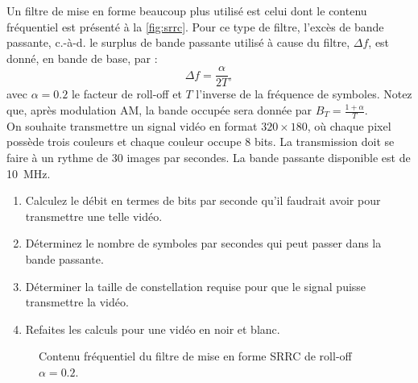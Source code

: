 \documentclass [a4paper, 11pt] {article}
\begin{document}
    \begin{exercice}{4}
        
        Un filtre de mise en forme beaucoup plus utilisé est celui dont le contenu fréquentiel est présenté à la \autoref{fig:srrc}. Pour ce type de filtre, l'excès de bande passante, c.-à-d. le surplus de bande passante utilisé à cause du filtre, $\Delta f$, est donné, en bande de base, par :
        \begin{equation}
            \Delta f = \frac{\alpha}{2 T},
        \end{equation}
        avec $\alpha=0.2$ le facteur de roll-off et $T$ l'inverse de la fréquence de symboles. Notez que, après modulation AM, la bande occupée sera donnée par $B_T=\frac{1+\alpha}{T}$.\\
        
        On souhaite transmettre un signal vidéo en format $320\times180$, où chaque pixel possède trois couleurs et chaque couleur occupe 8 bits. La transmission doit se faire à un rythme de 30 images par secondes. La bande passante disponible est de \SI{10}{\mega\hertz}.
        
        \begin{enumerate}
            \item Calculez le débit en termes de bits par seconde qu'il faudrait avoir pour transmettre une telle vidéo.
            \item Déterminez le nombre de symboles par secondes qui peut passer dans la bande passante.
            \item Déterminer la taille de constellation requise pour que le signal puisse transmettre la vidéo.
            \item Refaites les calculs pour une vidéo en noir et blanc.
        \end{enumerate}
        
        \begin{figure}[H]
            \centering
            \caption{Contenu fréquentiel du filtre de mise en forme SRRC de roll-off $\alpha=0.2$.}
            \label{fig:srrc}
        \end{figure}
        
    \end{exercice}
\end{document}
